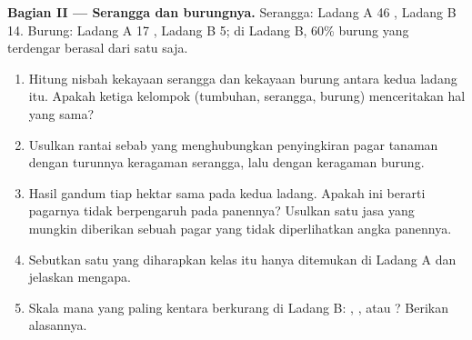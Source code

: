 \begin{problem}
\medskip
\noindent\textbf{Bagian II --- Serangga dan burungnya.}
Serangga: Ladang A 46 , Ladang B 14. Burung: Ladang A 17
, Ladang B 5; di Ladang B, 60\% burung yang terdengar berasal
dari satu  saja.
\begin{enumerate}[resume]
  \item Hitung nisbah kekayaan serangga dan kekayaan burung antara
        kedua ladang itu. Apakah ketiga kelompok (tumbuhan, serangga,
        burung) menceritakan hal yang sama?
  \item Usulkan rantai sebab yang menghubungkan penyingkiran pagar
        tanaman dengan turunnya keragaman serangga, lalu dengan
        keragaman burung.
  \item Hasil gandum tiap hektar sama pada kedua ladang. Apakah ini
        berarti pagarnya tidak berpengaruh pada panennya? Usulkan satu
        jasa yang mungkin diberikan sebuah pagar yang tidak
        diperlihatkan angka panennya.
  \item Sebutkan satu  yang diharapkan kelas itu hanya
        ditemukan di Ladang A dan jelaskan mengapa.
  \item Skala  mana yang paling kentara berkurang
        di Ladang B: , , atau ? Berikan alasannya.
\end{enumerate}


\end{problem}
